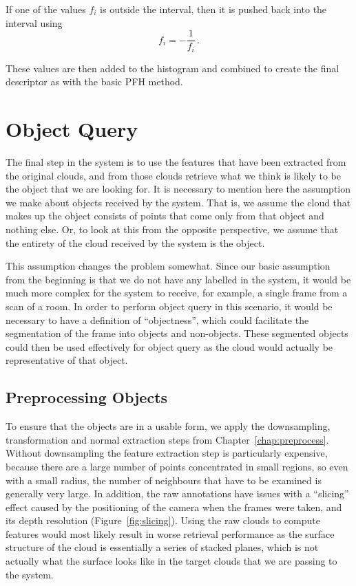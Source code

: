 \documentclass[11pt,a4paper]{kth-mag}
\begin{document}
If one of the values $f_i$ is outside the interval, then it is pushed back into
the interval using
\begin{equation}
  \label{eq:23}
  f_i=-\frac{1}{f_i}\,.
\end{equation}

These values are then added to the histogram and combined to create the final
descriptor as with the basic PFH method.

\chapter{Object Query}
\label{chap:query}
The final step in the system is to use the features that have been extracted
from the original clouds, and from those clouds retrieve what we think is likely
to be the object that we are looking for. It is necessary to mention here the
assumption we make about objects received by the system. That is, we assume the
cloud that makes up the object consists of points that come only from that
object and nothing else. Or, to look at this from the opposite perspective, we
assume that the entirety of the cloud received by the system is the object.

This assumption changes the problem somewhat. Since our basic assumption from
the beginning is that we do not have any labelled in the system, it would be
much more complex for the system to receive, for example, a single frame from
a scan of a room. In order to perform object query in this scenario, it would be
necessary to have a definition of ``objectness'', which could facilitate the
segmentation of the frame into objects and non-objects. These segmented objects
could then be used effectively for object query as the cloud would actually be
representative of that object.

\section{Preprocessing Objects}
To ensure that the objects are in a usable form, we apply the downsampling,
transformation and normal extraction steps from Chapter~\ref{chap:preprocess}.
Without downsampling the feature extraction step is particularly expensive,
because there are a large number of points concentrated in small regions, so
even with a small radius, the number of neighbours that have to be examined is
generally very large. In addition, the raw annotations have issues with a
``slicing'' effect caused by the positioning of the camera when the frames were
taken, and its depth resolution (Figure~\ref{fig:slicing}). Using the raw clouds
to compute features would most likely result in worse retrieval performance as
the surface structure of the cloud is essentially a series of stacked planes,
which is not actually what the surface looks like in the target clouds that we
are passing to the system.
\end{document}
